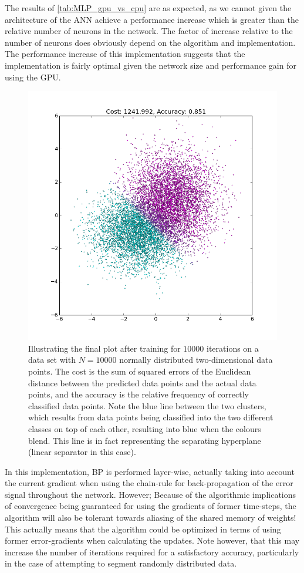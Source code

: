 The results of \ref{tab:MLP_gpu_vs_cpu} are as expected, as we cannot given the architecture of the ANN achieve a performance increase which is greater than the relative number of neurons in the network. The factor of increase relative to the number of neurons does obviously depend on the algorithm and implementation. The performance increase of this implementation suggests that the implementation is fairly optimal given the network size and performance gain for using the GPU.

\begin{figure}
\centering
\includegraphics[width=12cm]{fig/MLP_cluster_N_10000_1kiter}
\caption{Illustrating the final plot after training for $10 000$ iterations on a data set with $N=10 000$ normally distributed two-dimensional data points. The cost is the sum of squared errors of the Euclidean distance between the predicted data points and the actual data points, and the accuracy is the relative frequency of correctly classified data points. Note the blue line between the two clusters, which results from data points being classified into the two different classes on top of each other, resulting into blue when the colours blend. This line is in fact representing the separating hyperplane (linear separator in this case).}
\label{fig:theano_mlp_demo}
\end{figure}

In this implementation, BP is performed layer-wise, actually taking into account the current gradient when using the chain-rule for back-propagation of the error signal throughout the network. However;
Because of the algorithmic implications of convergence being guaranteed for using the gradients of former time-steps, the algorithm will also be tolerant towards aliasing of the shared memory of weights!
This actually means that the algorithm could be optimized in terms of using former error-gradients when calculating the updates. Note however, that this may increase the number of iterations required for a satisfactory accuracy, particularly in the case of attempting to segment randomly distributed data.

